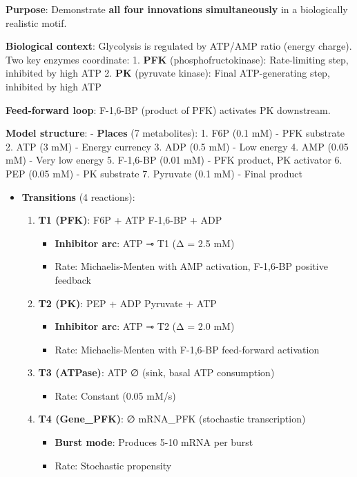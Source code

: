 \textbf{Purpose}: Demonstrate \textbf{all four innovations
simultaneously} in a biologically realistic motif.

\textbf{Biological context}: Glycolysis is regulated by ATP/AMP ratio
(energy charge). Two key enzymes coordinate: 1. \textbf{PFK}
(phosphofructokinase): Rate-limiting step, inhibited by high ATP 2.
\textbf{PK} (pyruvate kinase): Final ATP-generating step, inhibited by
high ATP

\textbf{Feed-forward loop}: F-1,6-BP (product of PFK) activates PK
downstream.

\textbf{Model structure}: - \textbf{Places} (7 metabolites): 1. F6P (0.1
mM) - PFK substrate 2. ATP (3 mM) - Energy currency 3. ADP (0.5 mM) -
Low energy 4. AMP (0.05 mM) - Very low energy 5. F-1,6-BP (0.01 mM) -
PFK product, PK activator 6. PEP (0.05 mM) - PK substrate 7. Pyruvate
(0.1 mM) - Final product

\begin{itemize}
\tightlist
\item
  \textbf{Transitions} (4 reactions):

  \begin{enumerate}
  \def\labelenumi{\arabic{enumi}.}
  \tightlist
  \item
    \textbf{T1 (PFK)}: F6P + ATP \textrightarrow F-1,6-BP + ADP

    \begin{itemize}
    \tightlist
    \item
      \textbf{Inhibitor arc}: ATP ⊸ T1 (Δ = 2.5 mM)
    \item
      Rate: Michaelis-Menten with AMP activation, F-1,6-BP positive
      feedback
    \end{itemize}
  \item
    \textbf{T2 (PK)}: PEP + ADP \textrightarrow Pyruvate + ATP

    \begin{itemize}
    \tightlist
    \item
      \textbf{Inhibitor arc}: ATP ⊸ T2 (Δ = 2.0 mM)
    \item
      Rate: Michaelis-Menten with F-1,6-BP feed-forward activation
    \end{itemize}
  \item
    \textbf{T3 (ATPase)}: ATP \textrightarrow ∅ (sink, basal ATP consumption)

    \begin{itemize}
    \tightlist
    \item
      Rate: Constant (0.05 mM/s)
    \end{itemize}
  \item
    \textbf{T4 (Gene\_PFK)}: ∅ \textrightarrow mRNA\_PFK (stochastic transcription)

    \begin{itemize}
    \tightlist
    \item
      \textbf{Burst mode}: Produces 5-10 mRNA per burst
    \item
      Rate: Stochastic propensity
    \end{itemize}
  \end{enumerate}
\end{itemize}


